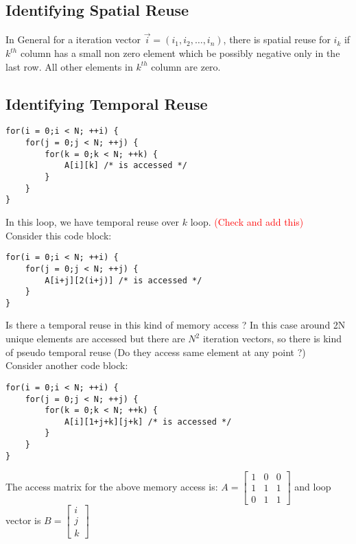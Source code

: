 \documentclass{article}
\begin{document}
\subsection*{Identifying Spatial Reuse}
In General for a iteration vector $\vec{i} = (i_1,i_2,\ldots,i_n)$, there is spatial reuse for $i_k$ if $k^{th}$ column has a small non zero element which be possibly negative only in the last row. All other elements in $k^{th}$ column are zero. \\

\subsection*{Identifying Temporal Reuse}
\begin{lstlisting}
for(i = 0;i < N; ++i) {
    for(j = 0;j < N; ++j) {
        for(k = 0;k < N; ++k) {
            A[i][k] /* is accessed */
        }
    }
}
\end{lstlisting}
In this loop, we have temporal reuse over $k$ loop. \textcolor{red}{(Check and add this)} \\


Consider this code block:
\begin{lstlisting}
for(i = 0;i < N; ++i) {
    for(j = 0;j < N; ++j) {
        A[i+j][2(i+j)] /* is accessed */
    }
}
\end{lstlisting}
Is there a temporal reuse in this kind of memory access ? In this case around 2N unique elements are accessed but there are $N^2$ iteration vectors, so there is kind of pseudo temporal reuse (Do they access same element at any point ?) \\

Consider another code block:
\begin{lstlisting}
for(i = 0;i < N; ++i) {
    for(j = 0;j < N; ++j) {
        for(k = 0;k < N; ++k) {
            A[i][1+j+k][j+k] /* is accessed */
        }
    }
}
\end{lstlisting}

The access matrix for the above memory access is:
$A = \begin{bmatrix}
    1 & 0 & 0 \\
    1 & 1 & 1 \\
    0 & 1 & 1
\end{bmatrix}$ and loop vector is $B = \begin{bmatrix}
    i \\ j \\ k
\end{bmatrix}$
\end{document}
